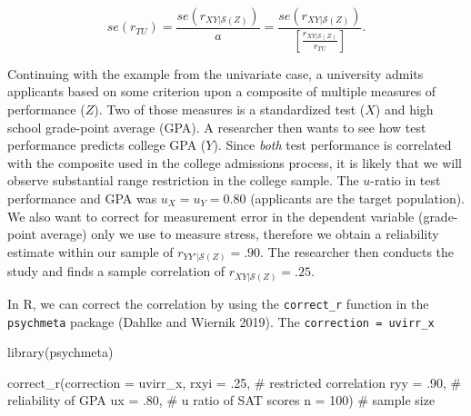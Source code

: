 \documentclass[
  letterpaper,
  DIV=11,
  numbers=noendperiod]{scrreprt}
\newenvironment{Shaded}{}{}
\newcommand{\AttributeTok}[1]{\textcolor[rgb]{0.00,0.34,0.68}{#1}}
\newcommand{\CommentTok}[1]{\textcolor[rgb]{0.54,0.53,0.53}{#1}}
\newcommand{\DecValTok}[1]{\textcolor[rgb]{0.69,0.50,0.00}{#1}}
\newcommand{\FunctionTok}[1]{\textcolor[rgb]{0.39,0.29,0.61}{#1}}
\newcommand{\NormalTok}[1]{\textcolor[rgb]{0.12,0.11,0.11}{#1}}
\newcommand{\StringTok}[1]{\textcolor[rgb]{0.75,0.01,0.01}{#1}}
\begin{document}
\[
se(r_{TU}) = \frac{se\left(r_{XY|\mathcal{S}(Z)}\right)}{\hat{a}}= \frac{se\left(r_{XY|\mathcal{S}(Z)}\right)}{\left[\frac{r_{XY|\mathcal{S}(Z)}}{r_{TU}}\right]}.
\]

\begin{tcolorbox}[enhanced jigsaw, toptitle=1mm, titlerule=0mm, arc=.35mm, breakable, colframe=quarto-callout-note-color-frame, title={Applied Example in R}, opacitybacktitle=0.6, opacityback=0, colbacktitle=quarto-callout-note-color!10!white, coltitle=black, bottomtitle=1mm, colback=white, bottomrule=.15mm, rightrule=.15mm, toprule=.15mm, leftrule=.75mm, left=2mm]

Continuing with the example from the univariate case, a university
admits applicants based on some criterion upon a composite of multiple
measures of performance (\(Z\)). Two of those measures is a standardized
test (\(X\)) and high school grade-point average (GPA). A researcher
then wants to see how test performance predicts college GPA (\(Y\)).
Since \emph{both} test performance is correlated with the composite used
in the college admissions process, it is likely that we will observe
substantial range restriction in the college sample. The \(u\)-ratio in
test performance and GPA was \(u_{X}=u_{Y}=0.80\) (applicants are the
target population). We also want to correct for measurement error in the
dependent variable (grade-point average) only we use to measure stress,
therefore we obtain a reliability estimate within our sample of
\(r_{YY'|\mathcal{S}(Z)}=.90\). The researcher then conducts the study
and finds a sample correlation of \(r_{XY|\mathcal{S}(Z)}=.25\).

In R, we can correct the correlation by using the \texttt{correct\_r}
function in the \texttt{psychmeta} package (Dahlke and Wiernik 2019).
The \texttt{correction\ =\ \textquotesingle{}uvirr\_x\textquotesingle{}}

\begin{Shaded}
\begin{Highlighting}[]
\FunctionTok{library}\NormalTok{(psychmeta)}

\FunctionTok{correct\_r}\NormalTok{(}\AttributeTok{correction =} \StringTok{\textquotesingle{}uvirr\_x\textquotesingle{}}\NormalTok{,}
          \AttributeTok{rxyi =}\NormalTok{ .}\DecValTok{25}\NormalTok{,  }\CommentTok{\# restricted correlation}
          \AttributeTok{ryy =}\NormalTok{ .}\DecValTok{90}\NormalTok{,  }\CommentTok{\# reliability of GPA}
          \AttributeTok{ux =}\NormalTok{ .}\DecValTok{80}\NormalTok{,   }\CommentTok{\# u ratio of SAT scores}
          \AttributeTok{n =} \DecValTok{100}\NormalTok{)    }\CommentTok{\# sample size}
\end{Highlighting}
\end{Shaded}


\end{tcolorbox}
\end{document}
